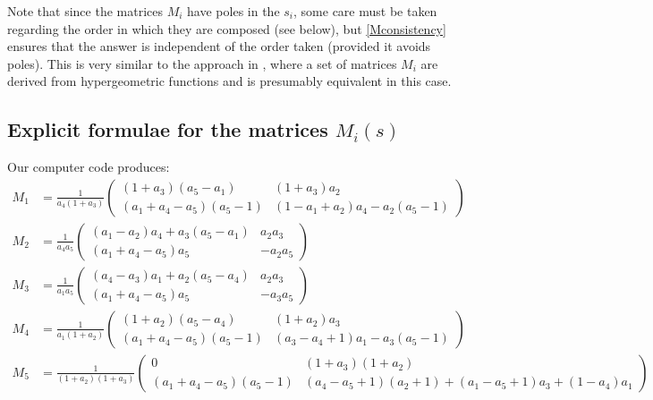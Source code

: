 \documentclass[a4paper,10pt]{amsart}
\theoremstyle{definition}
\theoremstyle{remark}
\numberwithin{equation}{section}
\newcommand{\0}{\color{blue}{\mathsf{0}}}
\begin{document}
Note that since the matrices $M_i$ have poles in the $s_i$, some care must be taken regarding the order in which they are composed (see below), but  
\eqref{Mconsistency} ensures that the answer is independent of the order taken (provided it avoids poles).  This is very similar to the approach in \cite{CMF}, where a set of matrices $M_i$ are derived  from  hypergeometric functions and is presumably equivalent in this case.


\subsection{Explicit formulae for the matrices $M_i(s)$} Our computer code produces: 
\begin{align*}
M_1 & =\frac{1}{a_4(1+a_3)}\begin{pmatrix}
\left(1+a_{3}\right) \left(a_{5} -a_{1} \right) & \left(1+a_{3}\right) a_{2} 
\\
 \left(a_{1}+a_{4} -a_{5} \right) \left(a_{5}-1\right) & \left(1-a_{1}+a_{2}\right) a_{4}-a_{2} \left(a_{5}-1\right)
\end{pmatrix} \\
M_2 & =\frac{1}{a_4a_5} \begin{pmatrix}
\left(a_{1}-a_{2}\right) a_{4}+a_{3} \left(a_{5}-a_{1}\right) & a_{2} a_{3} 
\\
 \left(a_{1}+a_{4} -a_{5}\right) a_{5} & -a_{2} a_{5} 
\end{pmatrix}
 \\
M_3& =\frac{1}{a_1a_5} \begin{pmatrix}
\left(a_4-a_{3}\right) a_{1}+a_{2} \left(a_{5}-a_{4}\right) & a_{2} a_{3} 
\\
  \left(a_{1}+a_{4} -a_{5}\right) a_{5}& -a_{3} a_{5} 
\end{pmatrix}
\\
M_4 &= \frac{1}{a_1(1+a_2)} \begin{pmatrix}
\left(1+a_{2}\right) \left(a_{5}-a_{4}\right) & \left(1+a_{2}\right) a_{3} 
\\
 \left(a_{1}+a_{4}-a_{5}\right) \left(a_{5}-1\right) & \left(a_{3}-a_{4}+1\right) a_{1}-a_{3} \left(a_{5} -1\right) 
\end{pmatrix}\\
M_5& =\frac{1}{(1+a_2)(1+a_3)} \begin{pmatrix}
0 & \left(1+a_{3}\right) \left(1+a_{2}\right) 
\\
 \left(a_{1}+a_{4} -a_{5}\right) \left(a_{5}-1\right) & \left(a_{4}-a_{5}+1\right)( a_{2}+1)+\left(a_{1}-a_{5}+1\right) a_{3}+\left(1-a_{4}\right) a_{1} 
\end{pmatrix}
\end{align*}
\end{document}
